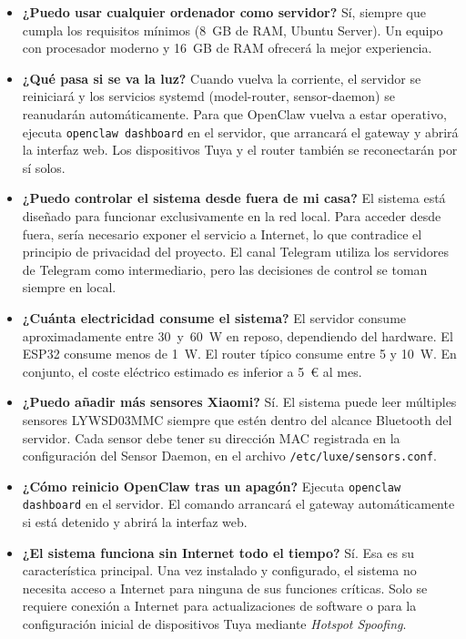 \begin{itemize}
    \item \textbf{¿Puedo usar cualquier ordenador como servidor?} Sí, siempre que cumpla los requisitos mínimos (8~GB de RAM, Ubuntu Server). Un equipo con procesador moderno y 16~GB de RAM ofrecerá la mejor experiencia.

    \item \textbf{¿Qué pasa si se va la luz?} Cuando vuelva la corriente, el servidor se reiniciará y los servicios systemd (model-router, sensor-daemon) se reanudarán automáticamente. Para que OpenClaw vuelva a estar operativo, ejecuta \texttt{openclaw dashboard} en el servidor, que arrancará el gateway y abrirá la interfaz web. Los dispositivos Tuya y el router también se reconectarán por sí solos.

    \item \textbf{¿Puedo controlar el sistema desde fuera de mi casa?} El sistema está diseñado para funcionar exclusivamente en la red local. Para acceder desde fuera, sería necesario exponer el servicio a Internet, lo que contradice el principio de privacidad del proyecto. El canal Telegram utiliza los servidores de Telegram como intermediario, pero las decisiones de control se toman siempre en local.

    \item \textbf{¿Cuánta electricidad consume el sistema?} El servidor consume aproximadamente entre 30~y~60~W en reposo, dependiendo del hardware. El ESP32 consume menos de 1~W. El router típico consume entre 5 y 10~W. En conjunto, el coste eléctrico estimado es inferior a 5~\euro{} al mes.

    \item \textbf{¿Puedo añadir más sensores Xiaomi?} Sí. El sistema puede leer múltiples sensores LYWSD03MMC siempre que estén dentro del alcance Bluetooth del servidor. Cada sensor debe tener su dirección MAC registrada en la configuración del Sensor Daemon, en el archivo \texttt{/etc/luxe/sensors.conf}.

    \item \textbf{¿Cómo reinicio OpenClaw tras un apagón?} Ejecuta \texttt{openclaw dashboard} en el servidor. El comando arrancará el gateway automáticamente si está detenido y abrirá la interfaz web.

    \item \textbf{¿El sistema funciona sin Internet todo el tiempo?} Sí. Esa es su característica principal. Una vez instalado y configurado, el sistema no necesita acceso a Internet para ninguna de sus funciones críticas. Solo se requiere conexión a Internet para actualizaciones de software o para la configuración inicial de dispositivos Tuya mediante \textit{Hotspot Spoofing}.


\end{itemize}
